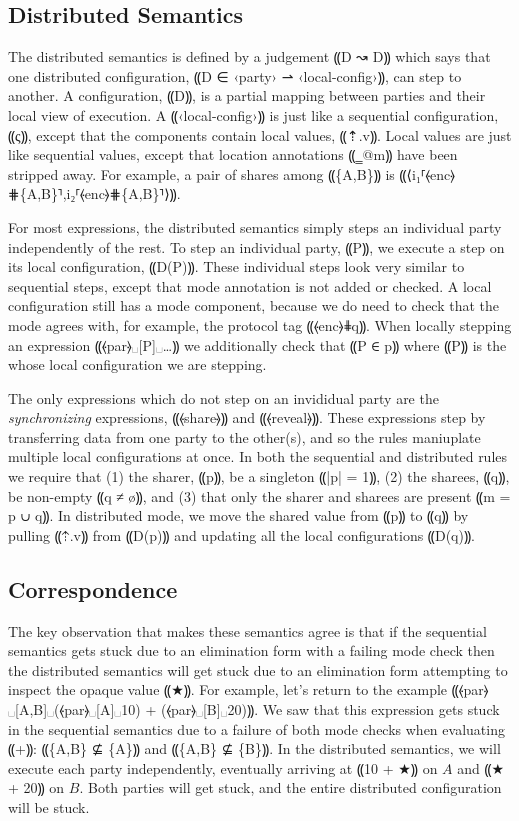 \subsection{Distributed Semantics}

The distributed semantics is defined by a judgement ⸨D ↝ D⸩ which says that
one distributed configuration, ⸨D ∈ ‹party› ⇀ ‹local-config›⸩, can step to another.
A configuration, ⸨D⸩, is a partial mapping between parties and their local
view of execution. A ⸨‹local-config›⸩ is just like a sequential configuration, ⸨ς⸩,
except that the components contain local values, ⸨⇡.v⸩. Local values are just like
sequential values, except that location annotations ⸨‗@m⸩ have been stripped away.
For example, a pair of shares among ⸨\{A,B\}⸩ is ⸨⟨i₁⸢⦑enc⦒⋕\{A,B\}⸣,i₂⸢⦑enc⦒⋕\{A,B\}⸣⟩⸩.

For most expressions, the distributed semantics simply steps an individual party independently of
the rest. To step an individual party, ⸨P⸩, we execute a step on its local configuration, ⸨D(P)⸩.
These individual steps look very similar to sequential steps, except that mode annotation is not added
or checked. A local configuration still has a mode component, because we do need to check that the mode
agrees with, for example, the protocol tag ⸨⦑enc⦒⋕q⸩. When locally stepping an expression ⸨⦑par⦒␣[P]␣…⸩
we additionally check that ⸨P ∈ p⸩ where ⸨P⸩ is the whose local configuration we are stepping.

The only expressions which do not step on an
invididual party are the \emph{synchronizing} expressions, ⸨⦑share⦒⸩ and ⸨⦑reveal⦒⸩. These expressions
step by transferring data from one party to the other(s), and so the rules maniuplate multiple local
configurations at once. In both the sequential and distributed rules we require that (1) the sharer,
⸨p⸩, be a singleton ⸨|p| = 1⸩, (2) the sharees, ⸨q⸩, be non-empty ⸨q ≠ ø⸩, and (3) that only the
sharer and sharees are present ⸨m = p ∪ q⸩. In distributed mode, we move the shared value from ⸨p⸩
to ⸨q⸩ by pulling ⸨⇡.v⸩ from ⸨D(p)⸩ and updating all the local configurations ⸨D(q)⸩.

\subsection{Correspondence}

The key observation that makes these semantics agree is that if the sequential semantics
gets stuck due to an elimination form with a failing mode check then the distributed semantics
will get stuck due to an elimination form attempting to inspect the opaque value ⸨★⸩. For example,
let's return to the example ⸨⦑par⦒␣[A,B]␣(⦑par⦒␣[A]␣10) + (⦑par⦒␣[B]␣20)⸩. We saw that this expression
gets stuck in the sequential semantics due to a failure of both mode checks when evaluating ⸨+⸩:
⸨\{A,B\} ⊈ \{A\}⸩ and ⸨\{A,B\} ⊈ \{B\}⸩. In the distributed semantics, we will execute each party
independently, eventually arriving at ⸨10 + ★⸩ on $A$ and ⸨★ + 20⸩ on $B$. Both parties will get
stuck, and the entire distributed configuration will be stuck.

